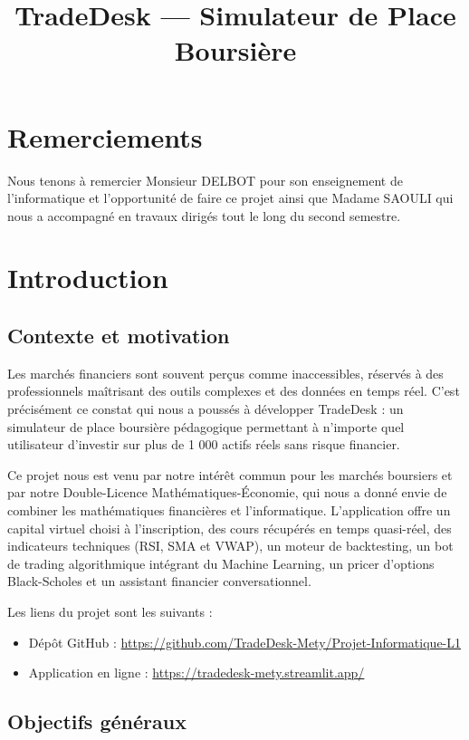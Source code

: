 \documentclass[a4paper, 12pt, twoside]{article}
\title{TradeDesk --- Simulateur de Place Boursière}
\begin{document}
\pagedegarde

\section*{Remerciements}
Nous tenons à remercier Monsieur DELBOT pour son enseignement de l'informatique et l'opportunité de faire ce projet ainsi que Madame SAOULI qui nous a accompagné en travaux dirigés tout le long du second semestre.

\newpage
\tableofcontents
\newpage

\section{Introduction}

\subsection{Contexte et motivation}

Les marchés financiers sont souvent perçus comme inaccessibles, réservés à des professionnels maîtrisant des outils complexes et des données en temps réel. C'est précisément ce constat qui nous a poussés à développer TradeDesk : un simulateur de place boursière pédagogique permettant à n'importe quel utilisateur d'investir sur plus de 1 000 actifs réels sans risque financier.

Ce projet nous est venu par notre intérêt commun pour les marchés boursiers et par notre Double-Licence Mathématiques-Économie, qui nous a donné envie de combiner les mathématiques financières et l'informatique. L'application offre un capital virtuel choisi à l'inscription, des cours récupérés en temps quasi-réel, des indicateurs techniques (RSI, SMA et VWAP), un moteur de backtesting, un bot de trading algorithmique intégrant du Machine Learning, un pricer d'options Black-Scholes et un assistant financier conversationnel.

Les liens du projet sont les suivants :
\begin{itemize}
    \item Dépôt GitHub :
          \url{https://github.com/TradeDesk-Mety/Projet-Informatique-L1}
    \item Application en ligne :
          \url{https://tradedesk-mety.streamlit.app/}
\end{itemize}

\subsection{Objectifs généraux}
\end{document}
